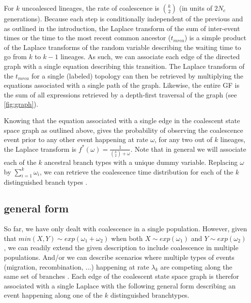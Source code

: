 \documentclass[10pt, a4]{article}
\begin{document}
For $k$ uncoalesced lineages, the rate of coalescence is ${k}\choose{2}$ (in units of $2N_e$ generations). Because each step is conditionally independent of the previous and as outlined in the introduction, the Laplace transform of the sum of inter-event times or the time to the most recent common ancestor ($t_{mrca}$) is a simple product of the Laplace transforms of the random variable describing the waiting time to go from $k$ to $k-1$ lineages. As such, we can associate each edge of the directed graph with a single equation describing this transition. The Laplace transform of the $t_{mrca}$ for a single (labeled) topology can then be retrieved by multiplying the equations associated with a single path of the graph. Likewise, the entire GF is the sum of all expressions retrieved by a depth-first traversal of the graph (see \ref{fig:graph}). %

Knowing that the equation associated with a single edge in the coalescent state space graph as outlined above, gives the probability of observing the coalescence event prior to any other event happening at rate $\omega$, for any two out of $k$ lineages, the Laplace transform is $f^{*}(\omega) = \frac{1}{{k\choose{2}} + \omega}$. Note that in general we will associate each of the $k$ ancestral branch types with a unique dummy variable. Replacing $\omega$ by $\sum_{i=1}^{k} \omega_i$, we can retrieve the coalescence time distribution for each of the $k$ distinguished branch types \citep{Lohse2011}. 

\subsection{general form}
So far, we have only dealt with coalescence in a single population. However, 
given that $min(X, Y) \sim exp(\omega_1+\omega_2)$ when both $X \sim exp(\omega_1)$ and $Y \sim exp(\omega_2)$, we can readily extend the given description to include coalescence in multiple populations. And/or we can describe scenarios where multiple types of events (migration, recombination, ...) happening at rate $\lambda_k$ are competing along the same set of branches \citep{Lohse2011}. Each edge of the coalescent state space graph is therefor associated with a single Laplace with the following general form describing an event happening along one of the $k$ distinguished branchtypes. %
\end{document}
